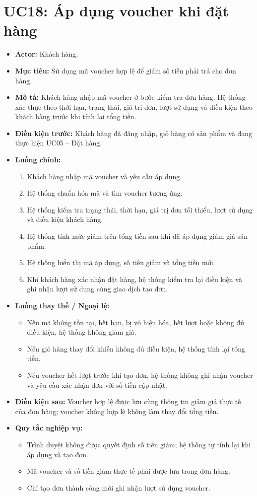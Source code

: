 \section{UC18: Áp dụng voucher khi đặt hàng}
\begin{itemize}
    \item \textbf{Actor:} Khách hàng.
    \item \textbf{Mục tiêu:} Sử dụng mã voucher hợp lệ để giảm số tiền phải trả cho đơn hàng.
    \item \textbf{Mô tả:} Khách hàng nhập mã voucher ở bước kiểm tra đơn hàng. Hệ thống xác thực theo thời hạn, trạng thái, giá trị đơn, lượt sử dụng và điều kiện theo khách hàng trước khi tính lại tổng tiền.
    \item \textbf{Điều kiện trước:} Khách hàng đã đăng nhập, giỏ hàng có sản phẩm và đang thực hiện UC05 -- Đặt hàng.
    \item \textbf{Luồng chính:}
    \begin{enumerate}
        \item Khách hàng nhập mã voucher và yêu cầu áp dụng.
        \item Hệ thống chuẩn hóa mã và tìm voucher tương ứng.
        \item Hệ thống kiểm tra trạng thái, thời hạn, giá trị đơn tối thiểu, lượt sử dụng và điều kiện khách hàng.
        \item Hệ thống tính mức giảm trên tổng tiền sau khi đã áp dụng giảm giá sản phẩm.
        \item Hệ thống hiển thị mã áp dụng, số tiền giảm và tổng tiền mới.
        \item Khi khách hàng xác nhận đặt hàng, hệ thống kiểm tra lại điều kiện và ghi nhận lượt sử dụng cùng giao dịch tạo đơn.
    \end{enumerate}
    \item \textbf{Luồng thay thế / Ngoại lệ:}
    \begin{itemize}
        \item Nếu mã không tồn tại, hết hạn, bị vô hiệu hóa, hết lượt hoặc không đủ điều kiện, hệ thống không giảm giá.
        \item Nếu giỏ hàng thay đổi khiến không đủ điều kiện, hệ thống tính lại tổng tiền.
        \item Nếu voucher hết lượt trước khi tạo đơn, hệ thống không ghi nhận voucher và yêu cầu xác nhận đơn với số tiền cập nhật.
    \end{itemize}
    \item \textbf{Điều kiện sau:} Voucher hợp lệ được lưu cùng thông tin giảm giá thực tế của đơn hàng; voucher không hợp lệ không làm thay đổi tổng tiền.
    \item \textbf{Quy tắc nghiệp vụ:}
    \begin{itemize}
        \item Trình duyệt không được quyết định số tiền giảm; hệ thống tự tính lại khi áp dụng và tạo đơn.
        \item Mã voucher và số tiền giảm thực tế phải được lưu trong đơn hàng.
        \item Chỉ tạo đơn thành công mới ghi nhận lượt sử dụng voucher.
    \end{itemize}
\end{itemize}
